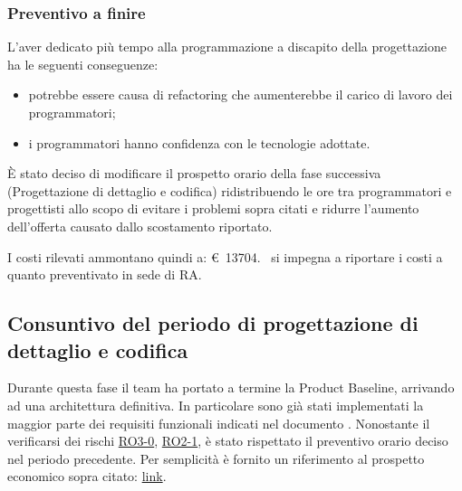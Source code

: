     \subsubsection{Preventivo a finire}
    L'aver dedicato più tempo alla programmazione a discapito della progettazione ha le seguenti conseguenze:
    \begin{itemize}
        \item potrebbe essere causa di refactoring che aumenterebbe il carico di lavoro dei programmatori;
        \item i programmatori hanno confidenza con le tecnologie adottate.
    \end{itemize}
    È stato deciso di modificare il prospetto orario della fase successiva (Progettazione di dettaglio e codifica) ridistribuendo le ore tra programmatori e progettisti allo scopo di evitare i problemi sopra citati e ridurre l'aumento dell'offerta causato dallo scostamento riportato.

    \label{table:nuovo_orario_codifica}
    \def\salarycontent{
        {Amministratore,22,20,440},
        {Analista,0,25,0},
        {Progettista,$80+\noexpand\textbf{10}$,22,1980},
        {Programmatore,$137-\noexpand\textbf{17}$,15,1800},
        {Responsabile,15,30,450},
        {Verificatore,82,15,1230},
        {Totale,329,127,$5935-\noexpand\textbf{35} = 5900 $ },
    }
    

    \noindent I costi rilevati ammontano quindi a: \euro\ 13704. \cod\ si impegna a riportare i costi a quanto preventivato in sede di RA.

\subsection{Consuntivo del periodo di progettazione di dettaglio e codifica}
    Durante questa fase il team ha portato a termine la Product Baseline, arrivando ad una architettura definitiva.
    In particolare sono già stati implementati la maggior parte dei requisiti funzionali indicati nel documento \AdR .
    Nonostante il verificarsi dei rischi \hyperref[section:rischi_rilevati]{RO3-0}, \hyperref[section:rischi_rilevati]{RO2-1},
    è stato rispettato il preventivo orario deciso nel periodo precedente. 
    Per semplicità è fornito un riferimento al prospetto economico sopra citato: \hyperref[table:nuovo_orario_codifica]{link}.
